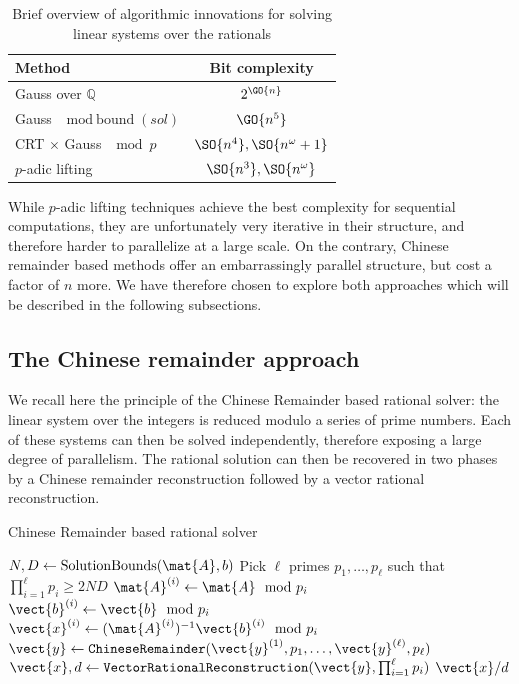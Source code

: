 \begin{table}[htb]
\begin{tabular}{lc}
  \toprule
  Method  & Bit complexity \\
  \midrule
  Gauss over $\mathbb{Q}$ & $2^{\GO{n}}$ \\
  Gauss $\mod \text{bound}(sol)$ & $\GO{n^5}$\\
  CRT $\times$ Gauss $\mod p$ & $\SO{n^4}, \SO{n^\omega+1}$\\
  $p$-adic lifting & $\SO{n^3}, \SO{n^\omega}$\\
  \bottomrule
\end{tabular}
\caption{Brief overview of algorithmic innovations for solving linear systems over the rationals}\label{tab:complexities}
\end{table}

While $p$-adic lifting techniques achieve the best complexity for sequential computations, they are unfortunately very
iterative in their structure, and therefore harder to parallelize at a large scale. On the contrary, Chinese remainder
based methods offer an embarrassingly parallel structure, but cost a factor of $n$ more. We have therefore chosen to
explore both approaches which will be described in the following subsections.
\subsection{The Chinese remainder approach}

We recall here the principle of the Chinese Remainder based rational solver:
the linear system over the integers is reduced modulo a series of prime numbers. Each of these systems can then be solved
independently, therefore exposing a large degree of parallelism. The rational solution can then be recovered in two
phases by a Chinese remainder reconstruction followed by a vector rational reconstruction.

\begin{algorithm}[htb]
  \caption{Chinese Remainder based rational solver}
  \begin{algorithmic}[1]
    \State $N,D \leftarrow \text{SolutionBounds}(\mat{A},b)$
    \State Pick $\ell$ primes $p_1,\dots, p_\ell$ such that $\prod_{i=1}^\ell p_i \geq 2ND$
    \State $\mat{A}^{(i)} \leftarrow \mat{A}\mod p_i$
    \State $\vect{b}^{(i)} \leftarrow \vect{b}\mod p_i$
    \State $\vect{x}^{(i)} \leftarrow (\mat{A}^{(i)})^{-1} \vect{b}^{(i)} \mod p_i$
    \EndFor
  \State $\vect{y} \leftarrow \texttt{ChineseRemainder}(\vect{y}^{(1)},p_1,\dots, \vect{y}^{(\ell)},p_\ell)$
  \State $\vect{x},d\leftarrow \texttt{VectorRationalReconstruction}(\vect{y},\prod_{i=1}^\ell p_i)$
  \State \Return $\vect{x}/d$
\end{algorithmic}
\end{algorithm}

